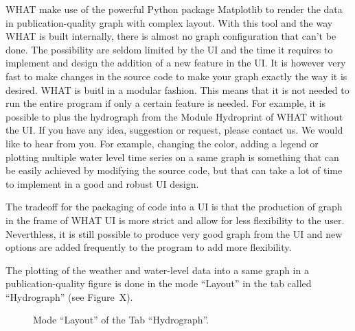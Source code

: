 \documentclass[WHATMANUAL.tex]{subfiles}
\begin{document}
WHAT make use of the powerful Python package Matplotlib to render the data in publication-quality graph with complex layout. With this tool and the way WHAT is built internally, there is almost no graph configuration that can't be done. The possibility are seldom limited by the UI and the time it requires to implement and design the addition of a new feature in the UI. It is however very fast to make changes in the source code to make your graph exactly the way it is desired. WHAT is buitl in a modular fashion. This means that it is not needed to run the entire program if only a certain feature is needed. For example, it is possible to plus the hydrograph from the Module Hydroprint of WHAT without the UI. If you have any idea, suggestion or request, please contact us. We would like to hear from you. For example, changing the color, adding a legend or plotting multiple water level time series on a same graph is something that can be easily achieved by modifying the source code, but that can take a lot of time to implement in a good and robust UI design.

The tradeoff for the packaging of code into a UI is that the production of graph in the frame of WHAT UI is more strict and allow for less flexibility to the user. Neverthless, it is still possible to produce very good graph from the UI and new options are added frequently to the program to add more flexibility.

The plotting of the weather and water-level data into a same graph in a publication-quality figure is done in the mode ``Layout'' in the tab called ``Hydrograph'' (see Figure~X).

\begin{figure}[h!]
	\setlength{\fboxsep}{0pt}
	\centering
	\caption[Mode ``Layout'' of the Tab ``Hydrograph'']{Mode ``Layout'' of the Tab ``Hydrograph''.}
	\label{fig:tab_hydrograph_layout}
\end{figure}
\end{document}
